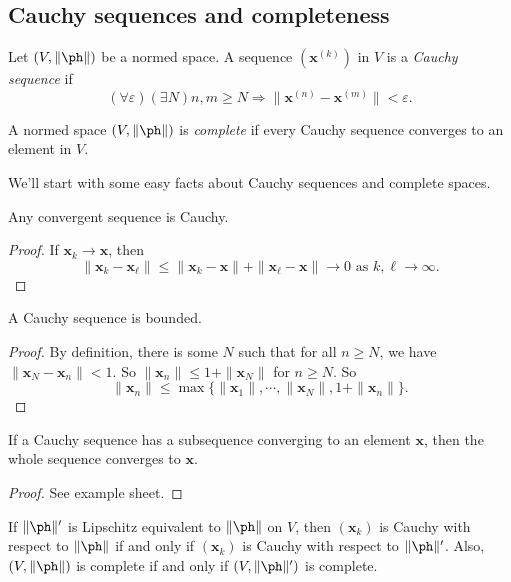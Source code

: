 \documentclass[a4paper]{article}
\begin{document}
\subsection{Cauchy sequences and completeness}
\begin{defi}
  Let $(V, \|\ph \|)$ be a normed space. A sequence $(\mathbf{x}^{(k)})$ in $V$ is a \emph{Cauchy sequence} if
  \[
    (\forall \varepsilon)(\exists N)n, m \geq N \Rightarrow \|\mathbf{x}^{(n)} - \mathbf{x}^{(m)}\| < \varepsilon.
  \]
\end{defi}

\begin{defi}
  A normed space $(V, \|\ph\|)$ is \emph{complete} if every Cauchy sequence converges to an element in $V$.
\end{defi}

We'll start with some easy facts about Cauchy sequences and complete spaces.
\begin{prop}
  Any convergent sequence is Cauchy.
\end{prop}

\begin{proof}
  If $\mathbf{x}_k \to \mathbf{x}$, then
  \[
    \|\mathbf{x}_k - \mathbf{x}_\ell\| \leq \|\mathbf{x}_k - \mathbf{x}\| + \|\mathbf{x}_\ell - \mathbf{x}\| \to 0 \text{ as }k, \ell \to \infty.
  \]
\end{proof}

\begin{prop}
  A Cauchy sequence is bounded.
\end{prop}

\begin{proof}
  By definition, there is some $N$ such that for all $n \geq N$, we have $\|\mathbf{x}_N - \mathbf{x}_n\| < 1$. So $\|\mathbf{x}_n\| \leq 1 + \|\mathbf{x}_N\|$ for $n \geq N$. So
  \[
    \|\mathbf{x}_n\| \leq \max\{\|\mathbf{x}_1\|, \cdots, \|\mathbf{x}_N\|, 1 + \|\mathbf{x}_n\|\}.
  \]
\end{proof}

\begin{prop}
  If a Cauchy sequence has a subsequence converging to an element $\mathbf{x}$, then the whole sequence converges to $\mathbf{x}$.
\end{prop}

\begin{proof}
  See example sheet.
\end{proof}

\begin{prop}
  If $\|\ph \|'$ is Lipschitz equivalent to $\|\ph\|$ on $V$, then $(\mathbf{x}_k)$ is Cauchy with respect to  $\|\ph \|$ if and only if $(\mathbf{x}_k)$ is Cauchy with respect to $\|\ph\|'$. Also, $(V, \|\ph\|)$ is complete if and only if $(V, \|\ph\|')$ is complete.
\end{prop}
\end{document}
